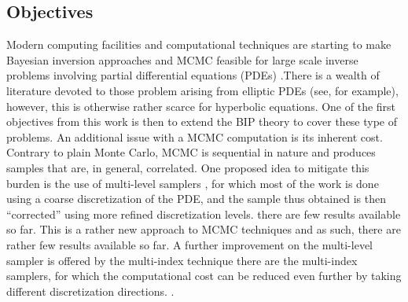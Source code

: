 \subsection{Objectives}
Modern computing facilities and computational techniques are starting to make Bayesian inversion approaches and  MCMC feasible for large scale inverse problems involving partial differential equations (PDEs) \cite{stuart2010inverse}.There is a wealth of literature devoted to those problem arising from elliptic PDEs (see, for example\cite{stuart2010inverse}), however, this is otherwise rather scarce for hyperbolic equations. One of the first objectives from this work is then to extend the BIP theory to cover these type of problems. An additional issue with a MCMC computation is its inherent cost. Contrary to plain Monte Carlo, MCMC is sequential in nature and produces samples that are, in general, correlated. One proposed idea to mitigate this burden is the use of multi-level  samplers \cite{dodwell2015hierarchical,hoang2013complexity,giles2008multilevel}, for which most of the work is done using a coarse discretization of the PDE, and the sample thus obtained is then ``corrected'' using more refined discretization levels. there are few results available so far. This is a rather new approach to MCMC techniques and as such, there are rather few results available so far. A further improvement on the multi-level sampler is offered by the multi-index technique \cite{haji2016multi} there are the multi-index samplers, for which the computational cost can be reduced even further \color{red} by taking different discretization directions. \color{black}.
